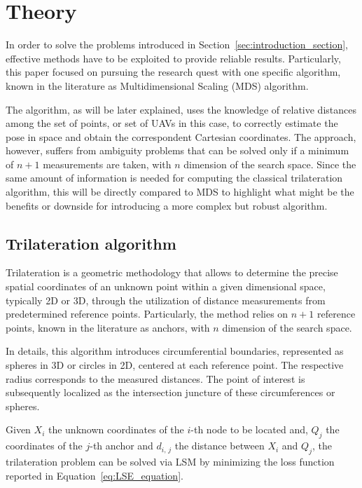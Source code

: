 \section{Theory}\label{sec:theory_section}
In order to solve the problems introduced in Section~\ref{sec:introduction_section}, effective methods have to be exploited to provide reliable results. Particularly, this paper focused on pursuing the research quest with one specific algorithm, known in the literature as Multidimensional Scaling (MDS) algorithm. \par

The algorithm, as will be later explained, uses the knowledge of relative distances among the set of points, or set of UAVs in this case, to correctly estimate the pose in space and obtain the correspondent Cartesian coordinates. The approach, however, suffers from ambiguity problems that can be solved only if a minimum of $n + 1$ measurements are taken, with $n$ dimension of the search space. Since the same amount of information is needed for computing the classical trilateration algorithm, this will be directly compared to MDS to highlight what might be the benefits or downside for introducing a more complex but robust algorithm.

\subsection{Trilateration algorithm}\label{sec:trilateration}
Trilateration is a geometric methodology that allows to determine the precise spatial coordinates of an unknown point within a given dimensional space, typically 2D or 3D, through the utilization of distance measurements from predetermined reference points. Particularly, the method relies on $n+1$ reference points, known in the literature as anchors, with $n$ dimension of the search space. \par

In details, this algorithm introduces circumferential boundaries, represented as spheres in 3D or circles in 2D, centered at each reference point. The respective radius corresponds to the measured distances. The point of interest is subsequently localized as the intersection juncture of these circumferences or spheres. \par


Given $X_i$ the unknown coordinates of the $i$-th node to be located and, $Q_j$ the coordinates of the $j$-th anchor and $d_{i,\,j}$ the distance between $X_i$ and $Q_j$, the trilateration problem can be solved via LSM by minimizing the loss function reported in Equation~\ref{eq:LSE_equation}.


